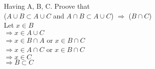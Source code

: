 \documentclass{article}
\begin{document}
\noindent Having A, B, C. Proove that\\
($A \cup B \subset A \cup C$ and $A \cap B \subset A \cup C$) $\Rightarrow$
($B \cap C$)\\
Let $x \in B$\\
$\Rightarrow x \in A \cup C$\\
$\Rightarrow x \in B \cap A$ or $ x \in B \cap C$\\
$\Rightarrow x  \in A \cap C $ or $ x \in B \cap C$\\
$\Rightarrow x \in C$\\
$\Rightarrow B \subset C$
\end{document}
